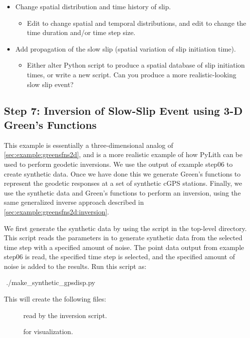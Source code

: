 \begin{itemize}
\item Change spatial distribution and time history of slip.
  \begin{itemize}
  \item Edit  to change spatial and
    temporal distributions, and edit  to change the
    time duration and/or time step size.
  \end{itemize}
\item Add propagation of the slow slip (spatial variation of slip
  initiation time).
  \begin{itemize}
  \item Either alter Python script to produce a spatial database of
    slip initiation times, or write a new script. Can you produce a
    more realistic-looking slow slip event?
  \end{itemize}
\end{itemize}

\subsection{Step 7: Inversion of Slow-Slip Event using 3-D Green's Functions}

This example is essentially a three-dimensional analog of
\vref{sec:example:greensfns2d}, and is a more realistic example of how
PyLith can be used to perform geodetic inversions. We use the output
of example step06 to create synthetic data. Once we have done this we
generate Green's functions to represent the geodetic responses at a
set of synthetic cGPS stations. Finally, we use the synthetic data and
Green's functions to perform an inversion, using the same generalized
inverse approach described in \vref{sec:example:greensfns2d:inversion}.

We first generate the synthetic data by using the script
 in the top-level
directory. This script reads the parameters in
 to generate synthetic data
from the selected time step with a specified amount of noise. The
point data output from example step06 is read, the specified time step
is selected, and the specified amount of noise is added to the
results. Run this script as:
\begin{shell}
$$ ./make_synthetic_gpsdisp.py
\end{shell}
This will create the following files:
\begin{description}
\item[] read by the
  inversion script.
\item[] for visualization.
\end{description}

